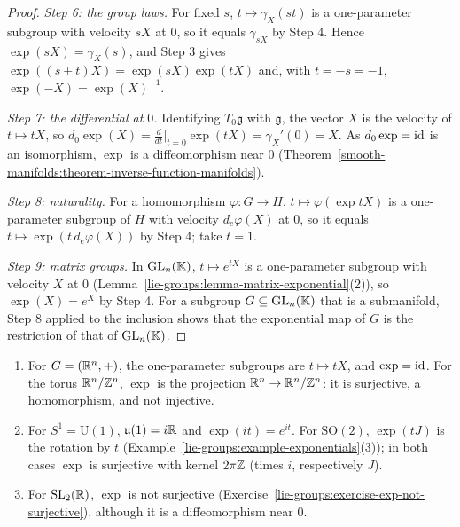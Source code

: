 \begin{proof}
\emph{Step 6: the group laws.} For fixed $s$, $t \mapsto \gamma_X(st)$ is a one-parameter subgroup with velocity $sX$ at $0$, so it equals $\gamma_{sX}$ by
Step 4. Hence $\exp(sX) = \gamma_X(s)$, and Step 3 gives $\exp((s + t)X) = \exp(sX)\exp(tX)$ and, with $t = -s = -1$, $\exp(-X) = \exp(X)^{-1}$.

\emph{Step 7: the differential at $0$.} Identifying $T_0\mathfrak{g}$ with $\mathfrak{g}$, the vector $X$ is the velocity of $t \mapsto tX$, so
$d_0\exp(X) = \frac{d}{dt}\big|_{t=0}\exp(tX) = \gamma_X'(0) = X$. As $d_0\exp = \mathrm{id}$ is an isomorphism, $\exp$ is a diffeomorphism near $0$
(Theorem~\ref{smooth-manifolds:theorem-inverse-function-manifolds}).

\emph{Step 8: naturality.} For a homomorphism $\varphi \colon G \to H$, $t \mapsto \varphi(\exp tX)$ is a one-parameter subgroup of $H$ with velocity
$d_e\varphi(X)$ at $0$, so it equals $t \mapsto \exp(t\,d_e\varphi(X))$ by Step 4; take $t = 1$.

\emph{Step 9: matrix groups.} In $\mathrm{GL}_n(\mathbb{K})$, $t \mapsto e^{tX}$ is a one-parameter subgroup with velocity $X$ at $0$
(Lemma~\ref{lie-groups:lemma-matrix-exponential}(2)), so $\exp(X) = e^X$ by Step 4. For a subgroup $G \subseteq \mathrm{GL}_n(\mathbb{K})$ that is a submanifold, Step 8
applied to the inclusion shows that the exponential map of $G$ is the restriction of that of $\mathrm{GL}_n(\mathbb{K})$.
\end{proof}

\begin{example}\label{lie-groups:example-exponential-maps}
\begin{enumerate}
\item For $G = (\mathbb{R}^n, +)$, the one-parameter subgroups are $t \mapsto tX$, and $\exp = \mathrm{id}$. For the torus $\mathbb{R}^n/\mathbb{Z}^n$, $\exp$ is the projection
$\mathbb{R}^n \to \mathbb{R}^n/\mathbb{Z}^n$: it is surjective, a homomorphism, and not injective.
\item For $S^1 = \mathrm{U}(1)$, $\mathfrak{u}(1) = i\mathbb{R}$ and $\exp(it) = e^{it}$. For $\mathrm{SO}(2)$, $\exp(tJ)$ is the rotation by $t$
(Example~\ref{lie-groups:example-exponentials}(3)); in both cases $\exp$ is surjective with kernel $2\pi\mathbb{Z}$ (times $i$, respectively $J$).
\item For $\mathrm{SL}_2(\mathbb{R})$, $\exp$ is not surjective (Exercise~\ref{lie-groups:exercise-exp-not-surjective}), although it is a diffeomorphism near $0$.
\end{enumerate}
\end{example}

